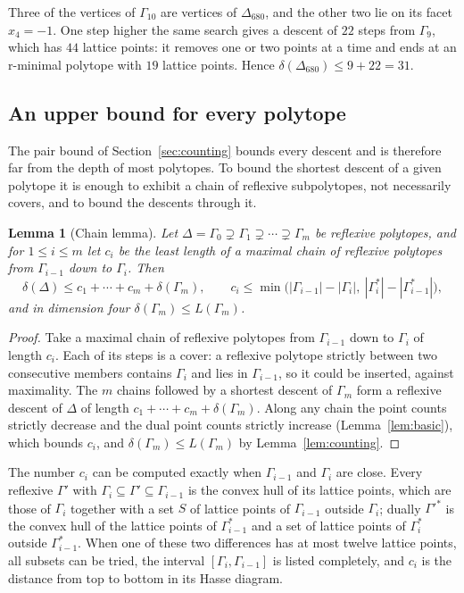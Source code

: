 \documentclass[11pt]{amsart}
\newtheorem{lemma}[theorem]{Lemma}
\theoremstyle{definition}
\theoremstyle{remark}
\newcommand{\Dbig}{\Delta_{680}}
\newcommand{\DUB}{31}
\begin{document}
Three of the vertices of $\Gamma_{10}$ are vertices of $\Dbig$, and the
other two lie on its facet $x_4=-1$. One step higher the same search gives
a descent of $22$ steps from $\Gamma_9$, which has $44$ lattice points: it
removes one or two points at a time and ends at an r-minimal polytope with
$19$ lattice points. Hence $\delta(\Dbig)\le9+22=\DUB$.

\subsection{An upper bound for every polytope}\label{ssec:upper}

The pair bound of Section~\ref{sec:counting} bounds every descent and is
therefore far from the depth of most polytopes. To bound the shortest
descent of a given polytope it is enough to exhibit a chain of reflexive
subpolytopes, not necessarily covers, and to bound the descents through
it.

\begin{lemma}[Chain lemma]\label{lem:chain}
Let $\Delta=\Gamma_0\supsetneq\Gamma_1\supsetneq\cdots\supsetneq\Gamma_m$
be reflexive polytopes, and for $1\le i\le m$ let $c_i$ be the least
length of a maximal chain of reflexive polytopes from $\Gamma_{i-1}$ down
to $\Gamma_i$. Then
\[
\delta(\Delta)\le c_1+\cdots+c_m+\delta(\Gamma_m),\qquad
c_i\le\min\bigl(|\Gamma_{i-1}|-|\Gamma_i|,\ |\Gamma_i^*|-|\Gamma_{i-1}^*|\bigr),
\]
and in dimension four $\delta(\Gamma_m)\le L(\Gamma_m)$.
\end{lemma}

\begin{proof}
Take a maximal chain of reflexive polytopes from $\Gamma_{i-1}$ down to
$\Gamma_i$ of length $c_i$. Each of its steps is a cover: a reflexive
polytope strictly between two consecutive members contains $\Gamma_i$ and
lies in $\Gamma_{i-1}$, so it could be inserted, against maximality. The
$m$ chains followed by a shortest descent of $\Gamma_m$ form a reflexive
descent of $\Delta$ of length $c_1+\cdots+c_m+\delta(\Gamma_m)$. Along any
chain the point counts strictly decrease and the dual point counts
strictly increase (Lemma~\ref{lem:basic}), which bounds $c_i$, and
$\delta(\Gamma_m)\le L(\Gamma_m)$ by Lemma~\ref{lem:counting}.
\end{proof}

The number $c_i$ can be computed exactly when $\Gamma_{i-1}$ and
$\Gamma_i$ are close. Every reflexive $\Gamma'$ with
$\Gamma_i\subseteq\Gamma'\subseteq\Gamma_{i-1}$ is the convex hull of its
lattice points, which are those of $\Gamma_i$ together with a set $S$ of
lattice points of $\Gamma_{i-1}$ outside $\Gamma_i$; dually $\Gamma'^*$ is
the convex hull of the lattice points of $\Gamma_{i-1}^*$ and a set of
lattice points of $\Gamma_i^*$ outside $\Gamma_{i-1}^*$. When one of these
two differences has at most twelve lattice points, all subsets can be
tried, the interval $[\Gamma_i,\Gamma_{i-1}]$ is listed completely, and
$c_i$ is the distance from top to bottom in its Hasse diagram.
\end{document}
